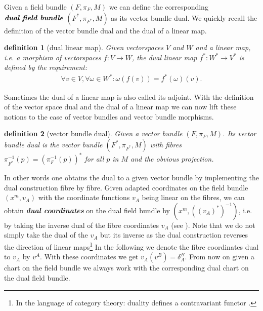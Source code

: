 \documentclass[a4paper,12pt, DIV=14, BCOR=5mm, twoside, headsepline]{scrbook}
\newtheorem{definition}{definition}[section]
\begin{document}
Given a field bundle $(F, \pi_F, M)$ we can define the corresponding $\textit{\textbf{dual field bundle}}$ $(F^{\ast}, \pi_{F^{\ast}},M)$ as its vector bundle dual. We quickly recall the definition of the vector bundle dual and the dual of a linear map.
\begin{definition}[dual linear map] \label{dual}
Given vectorspaces $V$ and $W$ and a linear map, i.e. a morphism of vectorspaces $f : V \rightarrow W$, the dual linear map $f^{\ast} : W^{\ast} \rightarrow V^{\ast}$ is defined by the requirement: 
\begin{align}
    \forall v \in V, \forall \omega \in W^{\ast} : \omega (f(v)) = f^{\ast}(\omega) (v).
\end{align}
\end{definition}
Sometimes the dual of a linear map is also called its adjoint. With the definition of the vector space dual and the dual of a linear map we can now lift these notions to the case of vector bundles and vector bundle morphisms.
\begin{definition} [vector bundle dual]
Given a vector bundle $(F, \pi_F,M)$. Its vector bundle dual is the vector bundle $(F^{\ast}, \pi_{F^{\ast}},M)$ with fibres $\pi_{F^{\ast}}^{-1}(p) = (\pi_F^{-1}(p))^{\ast} $ for all $p$ in $M$ and the obvious projection.  
\end{definition}
In other words one obtains the dual to a given vector bundle by implementing the dual construction fibre by fibre.
Given adapted coordinates on the field bundle $(x^m, v_A)$ with the coordinate functions $v_A$ being linear on the fibres, we can obtain \textbf{\textit{dual coordinates}} on the dual field bundle by $(x^m, ((v_A)^{\ast})^{-1})$, i.e. by taking the inverse dual of the fibre coordinates $v_A$ (see \cite{saunders_1989}). Note that we do not simply take the dual of the $v_A$ but its inverse as the dual construction reverses the direction of linear maps\footnote{In the language of category theory: duality defines a contravariant functor \cite{MacLane:205493}.} In the following we denote the fibre coordinates dual to $v_A$ by $v^A$. With these coordinates we get $ v_A(v^B) = \delta_A^B$. From now on given a chart on the field bundle we always work with the corresponding dual chart on the dual field bundle.\\
\end{document}
